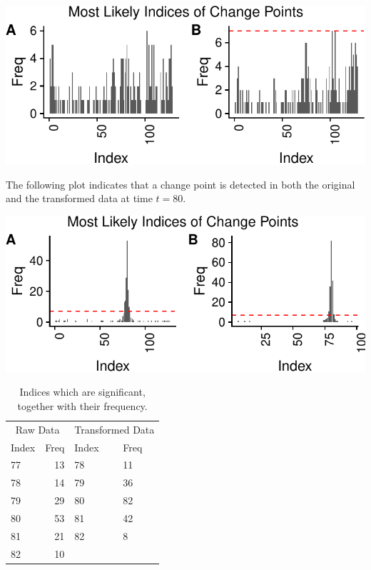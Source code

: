 \documentclass[smallextended]{svjour3}       %
\begin{document}
\begin{center}\includegraphics{springer_template_files/figure-latex/chunk_3-1} \end{center}

The following plot indicates that a change point is detected in both the
original and the transformed data at time \(t = 80\).

\begin{center}\includegraphics{springer_template_files/figure-latex/chunk_4_5-1} \end{center}

\begin{longtable}[t]{lrll}
\caption{\label{tab:chunk_4_5}Indices which are significant, together with their frequency.}\\
\toprule
\multicolumn{2}{c}{Raw Data} & \multicolumn{2}{c}{Transformed Data} \\
\cmidrule(l{2pt}r{2pt}){1-2} \cmidrule(l{2pt}r{2pt}){3-4}
Index & Freq & Index & Freq\\
\midrule
77 & 13 & 78 & 11\\
78 & 14 & 79 & 36\\
79 & 29 & 80 & 82\\
80 & 53 & 81 & 42\\
81 & 21 & 82 & 8\\
82 & 10 &  & \\
\bottomrule
\end{longtable}
\end{document}
